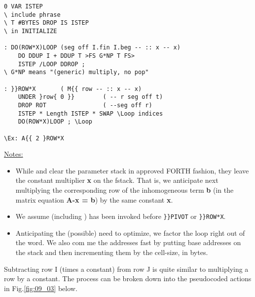 \begin{verbatim}
0 VAR ISTEP
\ include phrase
\ T #BYTES DROP IS ISTEP
\ in INITIALIZE

: DO(ROW*X)LOOP (seg off I.fin I.beg -- :: x -- x)
    DO DDUP I + DDUP T >FS G*NP T FS>
    ISTEP /LOOP DDROP ;
\ G*NP means "(generic) multiply, no pop"

: }}ROW*X       ( M{{ row -- :: x -- x)
    UNDER }row{ 0 }}        ( -- r seg off t)
    DROP ROT                ( --seg off r)
    ISTEP * Length ISTEP * SWAP \Loop indices
    DO(ROW*X)LOOP ; \Loop

\Ex: A{{ 2 }ROW*X 
\end{verbatim}
\underline{Notes:}
\begin{itemize}
    \item  While  and  clear the parameter stack in approved FORTH fashion, they leave the constant
        multiplier \textbf{x} on the fstack. That is, we anticipate next multiplying the corresponding row of the inhomogeneous term \textbf{b} (in
        the matrix equation \textbf{A-x = b}) by the same constant \textbf{x}.
    \item We assume  (including ) has been
        invoked before \verb|}}PIVOT| or \verb|}}ROW*X|.
  \item Anticipating the (possible) need to optimize, we factor the loop
right out of the word. We also com me the addresses fast by
putting base addresses on the stack and then incrementing
them by the cell-size, in bytes.
\end{itemize}


Subtracting row I (times a constant) from row J is quite similar to
multiplying a row by a constant. The process can be broken down
into the pseudocoded actions in Fig.\ref{fig:09_03} below.

